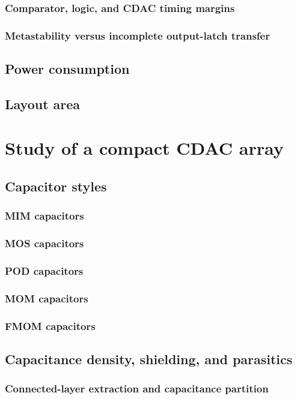 \documentclass[PhD, UKenglish]{scrbook}
\begin{document}
\subsubsection{Comparator, logic, and CDAC timing margins}
\subsubsection{Metastability versus incomplete output-latch transfer}
\subsection{Power consumption}
\subsection{Layout area}

\clearpage

\section{Study of a compact CDAC array}
\subsection{Capacitor styles}
\subsubsection{MIM capacitors}
\subsubsection{MOS capacitors}
\subsubsection{POD capacitors}
\subsubsection{MOM capacitors}
\subsubsection{FMOM capacitors}
\subsection{Capacitance density, shielding, and parasitics}
\subsubsection{Connected-layer extraction and capacitance partition}
\end{document}
